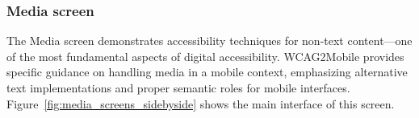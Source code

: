 \subsubsection{Media screen}
\label{subsubsec:media-screen}

The Media screen demonstrates accessibility techniques for non-text content—one of the most fundamental aspects of digital accessibility. WCAG2Mobile provides specific guidance on handling media in a mobile context, emphasizing alternative text implementations and proper semantic roles for mobile interfaces. Figure~\ref{fig:media_screens_sidebyside} shows the main interface of this screen.

\begin{figure}[ht]
    \centering
    \begin{subfigure}[b]{0.48\textwidth}
        \centering

\end{subfigure}
\end{figure}
